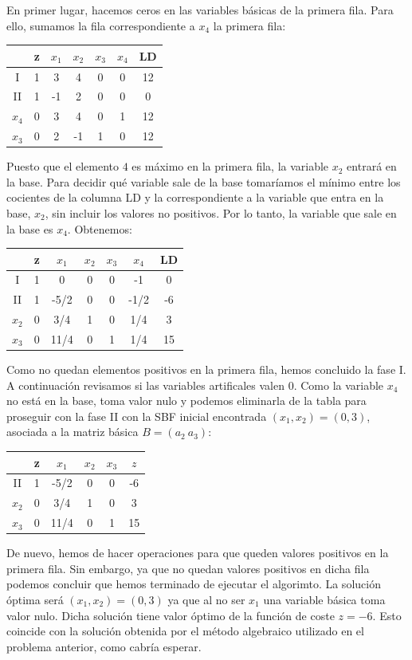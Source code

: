 \documentclass[11pt,table]{article}
\begin{document}
En primer lugar, hacemos ceros en las variables básicas de la primera fila. Para ello, sumamos la fila correspondiente a $x_4$ la primera fila:

\begin{table}[H]
	\centering
	\begin{tabular}{c|c|cccc|c}
		& z & $x_1$ & $x_2$ & $x_3$ & $x_4$ & LD \\
		\hline
		I & 1 & 3 & 4 & 0 & 0 & 12 \\
		II & 1 & -1 & 2 & 0 & 0 & 0 \\
		\hline
		$x_4$ & 0 & 3 & 4 & 0 & 1 & 12\\
		$x_3$ & 0 & 2 & -1 & 1 & 0 & 12
	\end{tabular}
\end{table}

Puesto que el elemento \(4\) es máximo en la primera fila, la variable \(x_2\) entrará en la base. Para decidir qué variable sale de la base tomaríamos el mínimo entre los cocientes de la columna LD y la correspondiente a la variable que entra en la base, \(x_2\), sin incluir los valores no positivos. Por lo tanto, la variable que sale en la base es \(x_4\). Obtenemos:

\begin{table}[H]
	\centering
	\begin{tabular}{c|c|cccc|c}
		& z & $x_1$ & $x_2$ & $x_3$ & $x_4$ & LD \\
		\hline
		I & 1 & 0 & 0 & 0 & -1 & 0\\
		II & 1 & -5/2 & 0 & 0 & -1/2 & -6\\
		\hline
		$x_2$ & 0 & 3/4 & 1 & 0 & 1/4 & 3\\
		$x_3$ & 0 & 11/4 & 0 & 1 & 1/4 & 15
	\end{tabular}
\end{table}

Como no quedan elementos positivos en la primera fila, hemos concluido la fase I. A continuación revisamos si las variables artificales valen \(0\). Como la variable \(x_4\) no está en la base, toma valor nulo y podemos eliminarla de la tabla para proseguir con la fase II con la SBF inicial encontrada $(x_1, x_2)=(0, 3)$, asociada a la matriz básica $B=(a_2 \ a_3)$:

\begin{table}[H]
	\centering
	\begin{tabular}{c|c|ccc|c}
		& z & $x_1$ & $x_2$ & $x_3$ & $z$\\
        \hline
		II & 1 & -5/2 & 0 & 0 & -6\\
		\hline
		$x_2$ & 0 & 3/4 & 1 & 0 & 3\\
		$x_3$ & 0 & 11/4 & 0 & 1 & 15
	\end{tabular}
\end{table}

De nuevo, hemos de hacer operaciones para que queden valores positivos en la primera fila. Sin embargo, ya que no quedan valores positivos en dicha fila podemos concluir que hemos terminado de ejecutar el algorimto. La solución óptima será $(x_1, x_2)=(0, 3)$ ya que al no ser \(x_1\) una variable básica toma valor nulo. Dicha solución tiene valor óptimo de la función de coste $z=-6$. Esto coincide con la solución obtenida por el método algebraico utilizado en el problema anterior, como cabría esperar.
    
\end{document}
